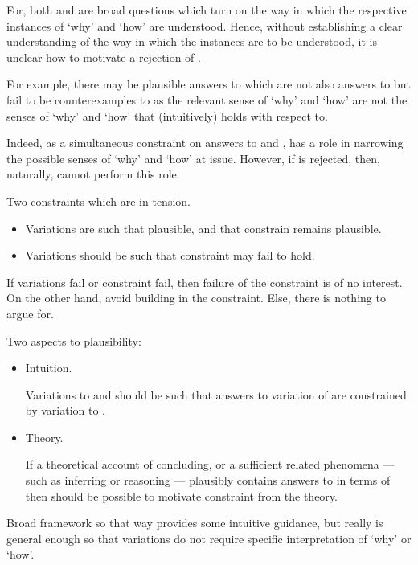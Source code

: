 \begin{note}
  For, both \qWhy{} and \qHow{} are broad questions which turn on the way in which the respective instances of `why' and `how' are understood.
  Hence, without establishing a clear understanding of the way in which the instances are to be understood, it is unclear how to motivate a rejection of \issueInclusion{}.

  For example, there may be plausible answers to \qWhy{} which are not also answers to \qHow{} but fail to be counterexamples to \issueInclusion{} as the relevant sense of `why' and `how' are not the senses of `why' and `how' that \issueInclusion{} (intuitively) holds with respect to.

  Indeed, as a simultaneous constraint on answers to \qWhy{} and \qHow{}, \issueInclusion{} has a role in narrowing the possible senses of `why' and `how' at issue.
  However, if \issueInclusion{} is rejected, then, naturally, \issueInclusion{} cannot perform this role.
\end{note}

\begin{note}
  Two constraints which are in tension.
  \begin{itemize}
  \item
    Variations are such that plausible, and that constrain remains plausible.
  \item
    Variations should be such that constraint may fail to hold.
  \end{itemize}

  If variations fail or constraint fail, then failure of the constraint is of no interest.
  On the other hand, avoid building in the constraint.
  Else, there is nothing to argue for.

  Two aspects to plausibility:
  \begin{itemize}
  \item
    Intuition.

    Variations to \qWhy{} and \qHow{} should be such that answers to variation of \qWhy{} are constrained by variation to \qHow{}.
  \item
    Theory.

    If a theoretical account of concluding, or a sufficient related phenomena --- such as inferring or reasoning --- plausibly contains answers to \qWhy{} in terms of \qHow{} then should be possible to motivate constraint from the theory.
  \end{itemize}

  Broad framework so that way provides some intuitive guidance, but really is general enough so that variations do not require specific interpretation of `why' or `how'.
\end{note}

